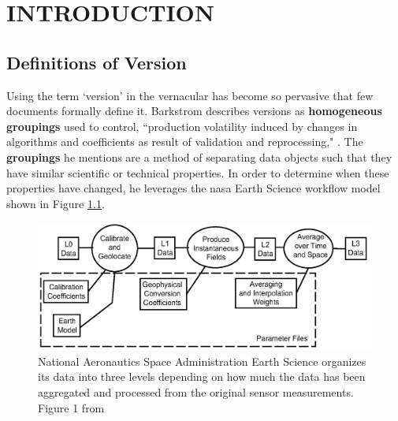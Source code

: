 
\chapter{INTRODUCTION}

\section{Definitions of Version} \label{sec:def}

Using the term `version' in the vernacular has become so pervasive that few documents formally define it.
Barkstrom describes versions as \textbf{homogeneous groupings} used to control, ``production volatility induced by changes in algorithms and coefficients as result of validation and reprocessing," \cite{Barkstrom2003}.
The \textbf{groupings} he mentions are a method of separating data objects such that they have similar scientific or technical properties.
In order to determine when these properties have changed, he leverages the \gls{nasa} Earth Science workflow model shown in Figure \ref{NASALevels}.
\begin{figure}
	\centering
	\includegraphics[scale=0.35]{figures/NASALevels.png}
	\caption[National Aeronautics and Space Administration Earth Science organizes its data into three levels depending on how much the data has been aggregated and processed from the original sensor measurements.]{National Aeronautics Space Administration Earth Science organizes its data into three levels depending on how much the data has been aggregated and processed from the original sensor measurements. Figure 1 from \cite{Barkstrom2003}}
	\label{NASALevels}
\end{figure}
